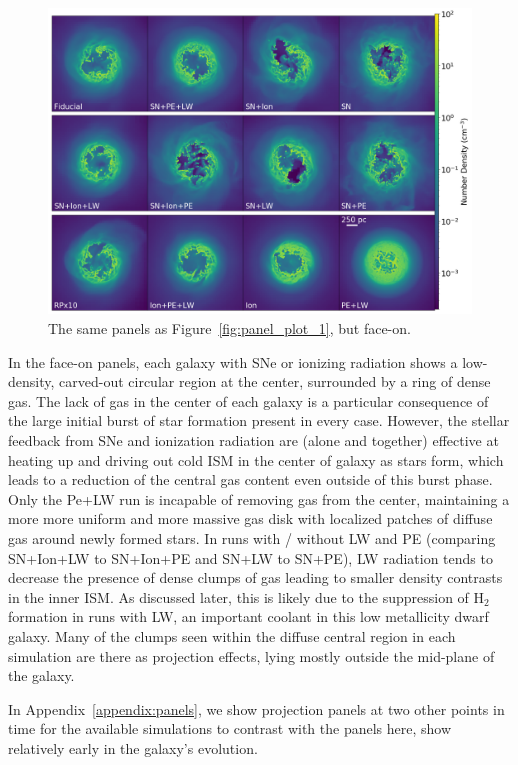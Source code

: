 \documentclass[twocolumn]{aastex62}
\begin{document}
\begin{figure}
  \centering
  \includegraphics[width=0.95\linewidth]{figures/proj_plot_n_z_125.png}
  \caption{The same panels as Figure~\ref{fig:panel_plot_1}, but face-on.}
  \label{fig:panel_plot_2}
\end{figure}

In the face-on panels, each galaxy with SNe or ionizing radiation shows a low-density, carved-out circular region at the center, surrounded by a ring of dense gas. The lack of gas in the center of each galaxy is a particular consequence of the large initial burst of star formation present in every case. However, the stellar feedback from SNe and ionization radiation are (alone and together) effective at heating up and driving out cold ISM in the center of galaxy as stars form, which leads to a reduction of the central gas content even outside of this burst phase. Only the Pe+LW run is incapable of removing gas from the center, maintaining a more more uniform and more massive gas disk with localized patches of diffuse gas around newly formed stars. In runs with / without LW and PE (comparing SN+Ion+LW to SN+Ion+PE and SN+LW to SN+PE), LW radiation tends to decrease the presence of dense clumps of gas leading to smaller density contrasts in the inner ISM. As discussed later, this is likely due to the suppression of H$_2$ formation in runs with LW, an important coolant in this low metallicity dwarf galaxy. Many of the clumps seen within the diffuse central region in each simulation are there as projection effects, lying mostly outside the mid-plane of the galaxy.  

In Appendix~\ref{appendix:panels}, we show projection panels at two other points in time for the available simulations to contrast with the panels here, show relatively early in the galaxy's evolution.
\end{document}
